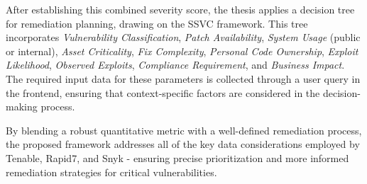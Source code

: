 After establishing this combined severity score, the thesis applies a decision tree for remediation planning, drawing on the \ac{SSVC} framework. This tree incorporates \emph{Vulnerability Classification}, \emph{Patch Availability}, \emph{System Usage} (public or internal), \emph{Asset Criticality}, \emph{Fix Complexity}, \emph{Personal Code Ownership}, \emph{Exploit Likelihood}, \emph{Observed Exploits}, \emph{Compliance Requirement}, and \emph{Business Impact}. The required input data for these parameters is collected through a user query in the frontend, ensuring that context-specific factors are considered in the decision-making process. 

By blending a robust quantitative metric with a well-defined remediation process, the proposed framework addresses all of the key data considerations employed by Tenable, Rapid7, and Snyk - ensuring precise prioritization and more informed remediation strategies for critical vulnerabilities.